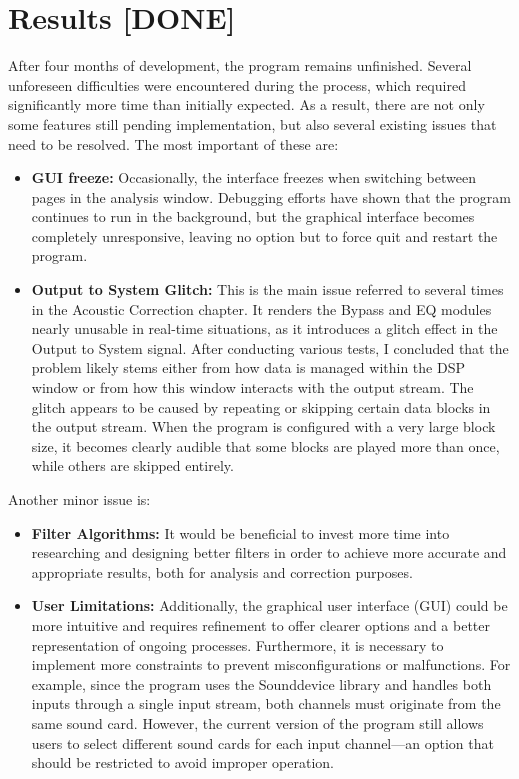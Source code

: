 \chapter{Results [DONE]}

After four months of development, the program remains unfinished. Several unforeseen difficulties were encountered during the process, which required significantly more time than initially expected. As a result, there are not only some features still pending implementation, but also several existing issues that need to be resolved. The most important of these are:

\begin{itemize}
	\item \textbf{GUI freeze:} Occasionally, the interface freezes when switching between pages in the analysis window. Debugging efforts have shown that the program continues to run in the background, but the graphical interface becomes completely unresponsive, leaving no option but to force quit and restart the program.
	
	\item \textbf{Output to System Glitch:} This is the main issue referred to several times in the Acoustic Correction chapter. It renders the Bypass and EQ modules nearly unusable in real-time situations, as it introduces a glitch effect in the Output to System signal. After conducting various tests, I concluded that the problem likely stems either from how data is managed within the DSP window or from how this window interacts with the output stream. The glitch appears to be caused by repeating or skipping certain data blocks in the output stream. When the program is configured with a very large block size, it becomes clearly audible that some blocks are played more than once, while others are skipped entirely.
\end{itemize}

Another minor issue is:

\begin{itemize}
		
	\item \textbf{Filter Algorithms:} It would be beneficial to invest more time into researching and designing better filters in order to achieve more accurate and appropriate results, both for analysis and correction purposes.
	
	\item \textbf{User Limitations:} Additionally, the graphical user interface (GUI) could be more intuitive and requires refinement to offer clearer options and a better representation of ongoing processes. Furthermore, it is necessary to implement more constraints to prevent misconfigurations or malfunctions. For example, since the program uses the Sounddevice library and handles both inputs through a single input stream, both channels must originate from the same sound card. However, the current version of the program still allows users to select different sound cards for each input channel—an option that should be restricted to avoid improper operation.
	
\end{itemize}

